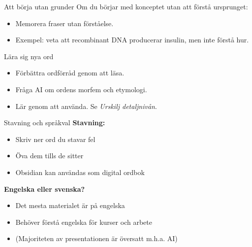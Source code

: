 \documentclass[presentation]{beamer}
\begin{document}
\begin{frame}{Att börja utan grunder}
  Om du börjar med konceptet utan att förstå ursprunget:
  \begin{itemize}
    \item Memorera fraser utan förståelse.
    \item Exempel: veta att recombinant DNA producerar insulin, men inte förstå hur.
  \end{itemize}
\end{frame}

\begin{frame}{Lära sig nya ord}
  \begin{itemize}
    \item Förbättra ordförråd genom att läsa.
    \item Fråga AI om ordens morfem och etymologi.
    \item Lär genom att använda. Se \textit{Urskilj detaljnivån}.
  \end{itemize}
\end{frame}

\begin{frame}{Stavning och språkval}
  \textbf{Stavning:}
  \begin{itemize}
    \item Skriv ner ord du stavar fel
    \item Öva dem tills de sitter
    \item Obsidian kan användas som digital ordbok
  \end{itemize}
  \textbf{Engelska eller svenska?}
  \begin{itemize}
    \item Det mesta materialet är på engelska
    \item Behöver förstå engelska för kurser och arbete
    \item (Majoriteten av presentationen är översatt m.h.a. AI)
  \end{itemize}
\end{frame}
\end{document}
